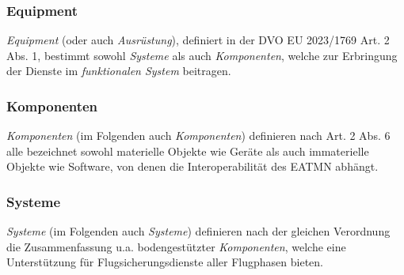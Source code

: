 
\subsubsection{\atmansf{} Equipment}
    
    \textit{\atmans{} Equipment} (oder auch \textit{\atmans{} Ausrüstung}), definiert in der \acf{DVO} \acs{EU} 2023/1769 Art. 2 Abs. 1, bestimmt sowohl \textit{Systeme} als auch \textit{Komponenten}, welche zur Erbringung der Dienste im \textit{funktionalen System} beitragen.
    \cite[Art.2 Abs.1]{2023R1769}

\subsubsection{\atmansf{} Komponenten}

    \textit{\atmans{} Komponenten} (im Folgenden auch \textit{Komponenten}) definieren nach  Art. 2 Abs. 6  alle bezeichnet sowohl materielle Objekte wie Geräte als auch immaterielle Objekte wie Software, von denen die Interoperabilität des \ac{EATMN} abhängt.
    \cite[Art.2 Abs.6]{2023R1769}

\subsubsection{\atmansf{} Systeme}

    \textit{\atmans{} Systeme} (im Folgenden auch \textit{Systeme}) definieren nach der gleichen Verordnung die Zusammenfassung u.a. bodengestützter \textit{Komponenten}, welche eine Unterstützung für Flugsicherungsdienste aller Flugphasen bieten. 
    \cite[Art.2 Abs.7]{2023R1769}

